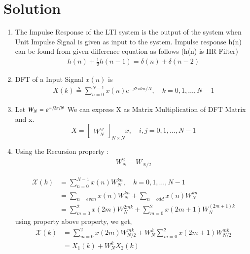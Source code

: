 \documentclass[journal,12pt,twocolumn]{IEEEtran}
\renewcommand\thesection{\arabic{section}}
\begin{document}
\section{Solution}
\begin{enumerate}[label=\thesection.\arabic*.,ref=\thesection.\theenumi]
\item
The Impulse Response of the LTI system is the output of the system when Unit Impulse Signal is given as input to the system.
Impulse response h(n) can be found from given difference equation as follows (h(n) is IIR Filter)
\begin{align}
    h(n) + \frac{1}{2}h(n-1) = \delta(n) + \delta(n-2)	
    \label{eq:equation4}
\end{align}

\item
DFT of a Input Signal $x(n)$ is 
\begin{align}
X(k) \triangleq \sum_{n=0}^{N-1} x(n) e^{-j 2 \pi k n / N}, \quad k=0,1, \ldots, N-1
\end{align}

\item
Let $W_{N} = e^{-j2\pi/N} \\$ 
We can express X as Matrix Multiplication of DFT Matrix and x.
\begin{equation}
X = 
\begin{bmatrix}
W^{ij}_{N} 
\end{bmatrix}_{N \times N}
x, \quad i,j = 0,1, \ldots, N-1
\end{equation}





\item
Using the Recursion property :
\begin{align}
	 W^{2}_{N} =  W_{N/2}  
\end{align}

\begin{align}
\mathcal X(k) &=  \sum_{n=0}^{N-1} x(n)W^{kn}_{N}, \quad k=0,1, \ldots, N-1 \\
&= \sum_{n=even} x(n)W^{kn}_{N} + \sum_{n=odd} x(n)W^{kn}_{N} \\
&= \sum_{m=0}^{2} x(2m)W^{2mk}_{N} + \sum_{m=0}^{2} x(2m+1)W^{(2m+1)k}_{N} 
\end{align}
using property above property, we get,
\begin{align}
\mathcal X(k) &= \sum_{m=0}^{2} x(2m)W^{mk}_{N/2} + W^{k}_{N} \sum_{m=0}^{2} x(2m+1)W^{mk}_{N/2} \\
&= X_{1}(k) + W^{k}_{N}X_{2}(k)
\end{align}


\end{enumerate}
\end{document}
